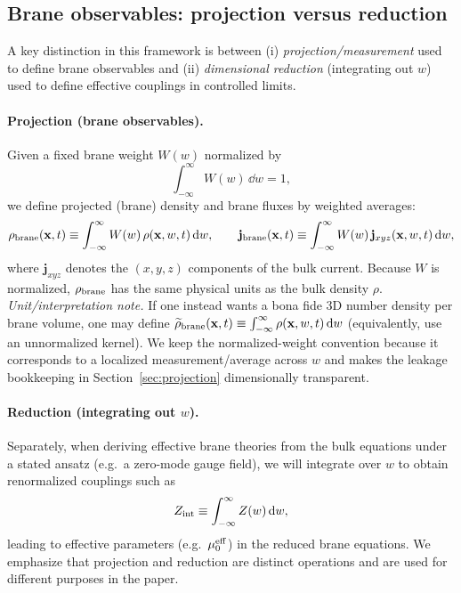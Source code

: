 \documentclass[11pt]{article}
\begin{document}
\subsection{Brane observables: projection versus reduction}
\label{sec:braneobs}

A key distinction in this framework is between (i) \emph{projection/measurement} used to define brane observables and (ii) \emph{dimensional reduction} (integrating out $w$) used to define effective couplings in controlled limits.

\paragraph{Projection (brane observables).}
Given a fixed brane weight $W(w)$ normalized by
\begin{equation}
\int_{-\infty}^{\infty} W(w)\,\dd w = 1,
\end{equation}
we define projected (brane) density and brane fluxes by weighted averages:
\begin{equation}
\rho_{\rm brane}(\mathbf{x},t)\equiv \int_{-\infty}^{\infty} W(w)\,\rho(\mathbf{x},w,t)\,\dd w,
\qquad
\mathbf{j}_{\rm brane}(\mathbf{x},t)\equiv \int_{-\infty}^{\infty} W(w)\,\mathbf{j}_{xyz}(\mathbf{x},w,t)\,\dd w,
\end{equation}
where $\mathbf{j}_{xyz}$ denotes the $(x,y,z)$ components of the bulk current. Because $W$ is normalized, $\rho_{\rm brane}$ has the same physical units as the bulk density $\rho$.
\noindent\emph{Unit/interpretation note.} If one instead wants a bona fide 3D number density per brane volume, one may define $\widetilde\rho_{\rm brane}(\mathbf x,t)\equiv\int_{-\infty}^{\infty}\rho(\mathbf x,w,t)\,\dd w$ (equivalently, use an unnormalized kernel). We keep the normalized-weight convention because it corresponds to a localized measurement/average across $w$ and makes the leakage bookkeeping in Section~\ref{sec:projection} dimensionally transparent.

\paragraph{Reduction (integrating out $w$).}
Separately, when deriving effective brane theories from the bulk equations under a stated ansatz (e.g.\ a zero-mode gauge field), we will integrate over $w$ to obtain renormalized couplings such as
\begin{equation}
Z_{\rm int} \equiv \int_{-\infty}^{\infty} Z(w)\,\dd w,
\end{equation}
leading to effective parameters (e.g.\ $\mu_0^{\rm eff}$) in the reduced brane equations. We emphasize that projection and reduction are distinct operations and are used for different purposes in the paper.
\end{document}
